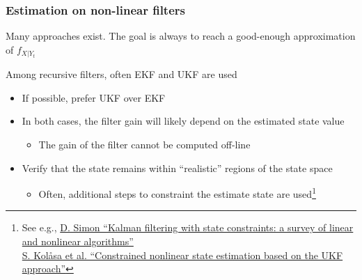 \begin{frame}
	\frametitle{Estimation on non-linear filters}
	Many approaches exist. The goal is always to reach a good-enough approximation of $f_{X|Y_t}$\\\vspace{1em}

	Among recursive filters, often EKF and UKF are used 
	\begin{itemize}\setlength\itemsep{1em}
		\item If possible, prefer UKF over EKF
		\item In both cases, the filter gain will likely depend on the estimated state value
		\begin{itemize}
			\item The gain of the filter cannot be computed off-line
		\end{itemize}
		\item Verify that the state remains within ``realistic'' regions of the state space
		\begin{itemize}\setlength\itemsep{0.5em}
			\item Often, additional steps to constraint the estimate state are used\footnote{See e.g., \href{http://academic.csuohio.edu/simond/pubs/IETKalman.pdf}{D. Simon ``Kalman filtering with state constraints: a survey of linear and nonlinear algorithms''}\\
			\href{http://folk.ntnu.no/bjarnean/pubs/journals/journal-51.pdf?id=ansatte/Foss_Bjarne/pubs/journals/journal-51.pdf}{S. Kolåsa et al. ``Constrained nonlinear state estimation based on the UKF approach''}}
		\end{itemize}
	\end{itemize}
\end{frame}